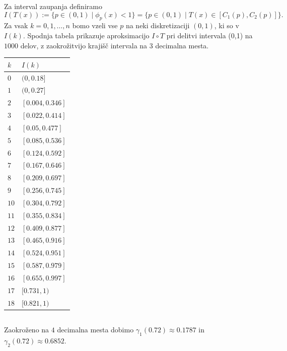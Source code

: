 \documentclass[ letterpaper, titlepage, fleqn]{article}
\begin{document}
Za interval zaupanja definiramo
$$I(T(x)) := \{p \in (0,1) \mid \phi_p(x) < 1\} = \{p \in (0,1) \mid T(x) \in [C_1(p), C_2(p)]\}.$$
Za vsak $k=0,1,\dots,n$ bomo vzeli vse $p$ na neki diskretizaciji $(0,1)$, ki so v $I(k)$. Spodnja tabela prikazuje aproksimacijo $I\circ T$ pri delitvi intervala (0,1) na $1000$ delov, z zaokrožitvijo krajišč intervala na $3$ decimalna mesta.
\begin{center}
\begin{tabular}{ |l|l| }
\hline
$k$ & $I(k)$ \\
\hline
$0$ & $ (0, 0.18]$ \\
$1$ & $(0, 0.27]$ \\
$2$ & $[0.004, 0.346]$ \\
$3$ & $[0.022, 0.414]$ \\
$4$ & $[0.05, 0.477]$ \\
$5$ & $[0.085, 0.536]$ \\
$6$ & $[0.124, 0.592]$ \\
$7$ & $[0.167, 0.646]$ \\
$8$ & $[0.209, 0.697]$ \\
$9$ & $[0.256, 0.745]$ \\
$10$ & $[0.304, 0.792]$ \\
$11$ & $[0.355, 0.834]$ \\
$12$ & $[0.409, 0.877]$ \\
$13$ & $[0.465, 0.916]$ \\
$14$ & $[0.524, 0.951]$ \\
$15$ & $[0.587, 0.979]$ \\
$16$ & $[0.655, 0.997]$ \\
$17$ & $[0.731, 1)$ \\
$18$ & $[0.821, 1)$ \\
\hline
\end{tabular}
\end{center}

\subsection{}
Zaokroženo na $4$ decimalna mesta dobimo $\gamma_1(0.72) \approx 0.1787$ in $\gamma_2(0.72) \approx 0.6852$.
\end{document}
